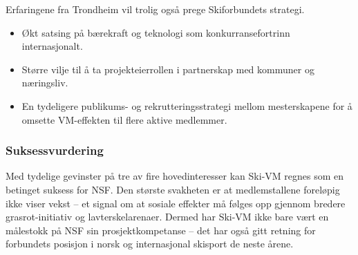 Erfaringene fra Trondheim vil trolig også prege Skiforbundets strategi.
\begin{itemize}
    \item Økt satsing på bærekraft og teknologi som konkurransefortrinn internasjonalt.
    \item Større vilje til å ta projekteierrollen i partnerskap med kommuner og næringsliv.
    \item En tydeligere publikums- og rekrutteringsstrategi mellom mesterskapene for å omsette VM-effekten til flere aktive medlemmer.
\end{itemize}

\subsubsection{Suksessvurdering}
Med tydelige gevinster på tre av fire hovedinteresser kan Ski-VM regnes som en betinget suksess for NSF. Den største svakheten er at medlemstallene foreløpig ikke viser vekst -- et signal om at sosiale effekter må følges opp gjennom bredere grasrot-initiativ og lavterskelarenaer.
Dermed har Ski-VM ikke bare vært en målestokk på NSF sin prosjektkompetanse -- det har også gitt retning for forbundets posisjon i norsk og internasjonal skisport de neste årene.